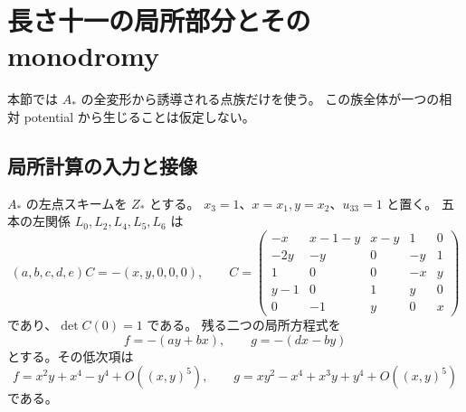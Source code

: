 \section{長さ十一の局所部分とその monodromy}
\label{sec:residual-monodromy}
本節では $A_*$ の全変形から誘導される点族だけを使う。
この族全体が一つの相対 potential から生じることは仮定しない。

\subsection{局所計算の入力と接像}
$A_*$ の左点スキームを $Z_*$ とする。
$x_3=1$、$x=x_1,y=x_2$、$u_{33}=1$ と置く。
五本の左関係 $L_0,L_2,L_4,L_5,L_6$ は
\[
 (a,b,c,d,e)C=-(x,y,0,0,0),\qquad
 C=\begin{pmatrix}
 -x&x-1-y&x-y&1&0\\
 -2y&-y&0&-y&1\\
 1&0&0&-x&y\\
 y-1&0&1&y&0\\
 0&-1&y&0&x
 \end{pmatrix}
\]
であり、$\det C(0)=1$ である。
残る二つの局所方程式を
\begin{equation}\label{eq:local-fg}
 f=-(ay+bx),\qquad g=-(dx-by)
\end{equation}
とする。その低次項は
\begin{equation}\label{eq:local-jets}
 f=x^2y+x^4-y^4+O((x,y)^5),\qquad
 g=xy^2-x^4+x^3y+y^4+O((x,y)^5)
\end{equation}
である。

